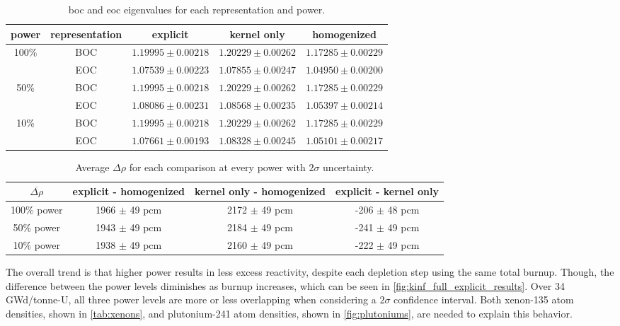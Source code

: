 \documentclass[letterpaper]{physor2024}
\begin{document}
\begin{table}[!h]
    \centering
    \caption{\gls{boc} and \gls{eoc} eigenvalues for each representation and power.}
    \begin{tabular}{|c|c|c|c|c|} \hline
    \multicolumn{1}{|c|}{power} & \multicolumn{1}{c|}{representation} & \multicolumn{1}{c|}{explicit} & \multicolumn{1}{c|}{kernel only} & \multicolumn{1}{c|}{homogenized} \\
    \hline
    \multirow{2}{*}{100\%} & BOC & $1.19995 \pm 0.00218$ & $1.20229 \pm 0.00262$ & $1.17285 \pm 0.00229 $ \\
    \cline{2-5}
     & EOC & $1.07539 \pm 0.00223$ & $1.07855 \pm 0.00247$ & $1.04950 \pm 0.00200 $ \\
    \hline
    \multirow{2}{*}{50\%} & BOC & $1.19995 \pm 0.00218$ & $1.20229 \pm 0.00262$ & $1.17285 \pm 0.00229$ \\
    \cline{2-5}
     & EOC & $1.08086 \pm 0.00231$ & $1.08568 \pm 0.00235$ & $1.05397 \pm 0.00214$ \\
     \hline
    \multirow{2}{*}{10\%} & BOC & $1.19995 \pm 0.00218$ & $1.20229 \pm 0.00262$ & $1.17285 \pm 0.00229$ \\
    \cline{2-5}
     & EOC & $1.07661 \pm 0.00193$ & $1.08328 \pm  0.00245$ & $1.05101 \pm 0.00217$ \\
    \cline{1-5}
    \end{tabular}
    \label{tab:begin_to_end}
    \vspace*{-0.3cm}
\end{table}

\begin{table}[!h]
    \caption{Average $\Delta \rho$ for each comparison at every power with $2\sigma$ uncertainty.}
    \begin{tabular}{c|c|c|c}
    $\overline{\Delta \rho}$ & explicit - homogenized & kernel only - homogenized & explicit - kernel only \\ \hline
    100\% power & 1966 $\pm$ 49 pcm & 2172 $\pm$ 49 pcm & -206 $\pm$ 48 pcm \\
    50\% power & 1943 $\pm$ 49 pcm & 2184 $\pm$ 49 pcm & -241 $\pm$ 49 pcm\\
    10\% power & 1938 $\pm$ 49 pcm & 2160 $\pm$ 49 pcm & -222 $\pm$ 49 pcm
    \end{tabular}
    \label{tab:average_pcms}
\end{table}

The overall trend is that higher power results in less excess reactivity, despite each depletion step using the same total burnup. Though, the difference between the power levels diminishes as burnup increases, which can be seen in \cref{fig:kinf_full_explicit_results}. Over 34 GWd/tonne-U, all three power levels \kinf are more or less overlapping when considering a $2\sigma$ confidence interval. Both xenon-135 atom densities, shown in \cref{tab:xenons}, and plutonium-241 atom densities, shown in \cref{fig:plutoniums}, are needed to explain this behavior.
\end{document}
